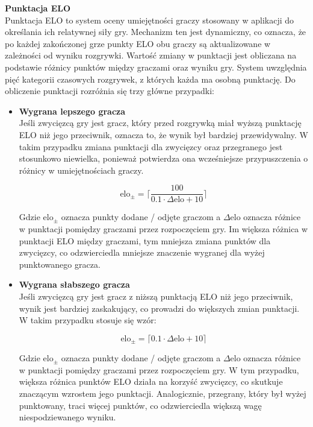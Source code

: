 \documentclass[twoside]{projektInzynierskiMS1}
\begin{document}
\newpage

\noindent \textbf{Punktacja ELO}\\
Punktacja ELO to system oceny umiejętności graczy stosowany w aplikacji do określania ich relatywnej siły gry. Mechanizm ten jest dynamiczny, co oznacza, że po każdej zakończonej grze punkty ELO obu graczy są aktualizowane w zależności od wyniku rozgrywki. Wartość zmiany w punktacji jest obliczana na podstawie różnicy punktów między graczami oraz wyniku gry. System uwzględnia pięć kategorii czasowych rozgrywek, z których każda ma osobną punktację. Do obliczenie punktacji rozróżnia się trzy główne przypadki:

\begin{itemize}
    \item \textbf{Wygrana lepszego gracza}\\
    Jeśli zwycięzcą gry jest gracz, który przed rozgrywką miał wyższą punktację ELO niż jego przeciwnik, oznacza to, że wynik był bardziej przewidywalny. W takim przypadku zmiana punktacji dla zwycięzcy oraz przegranego jest stosunkowo niewielka, ponieważ potwierdza ona wcześniejsze przypuszczenia o różnicy w umiejętnościach graczy.

    \[ \text{elo}_{\pm} = \lceil \frac{100}{0.1 \cdot \Delta \text{elo} + 10} \rceil \]

    Gdzie $ \text{elo}_{\pm} $ oznacza punkty dodane / odjęte graczom a $ \Delta \text{elo} $ oznacza różnice w punktacji pomiędzy graczami przez rozpoczęciem gry. Im większa różnica w punktacji ELO między graczami, tym mniejsza zmiana punktów dla zwycięzcy, co odzwierciedla mniejsze znaczenie wygranej dla wyżej punktowanego gracza.

    \item \textbf{Wygrana słabszego gracza}\\
    Jeśli zwycięzcą gry jest gracz z niższą punktacją ELO niż jego przeciwnik, wynik jest bardziej zaskakujący, co prowadzi do większych zmian punktacji. W takim przypadku stosuje się wzór:

    \[ \text{elo}_{\pm} = \lceil 0.1 \cdot \Delta \text{elo} + 10 \rceil \]

    Gdzie $ \text{elo}_{\pm} $ oznacza punkty dodane / odjęte graczom a $ \Delta \text{elo} $ oznacza różnice w punktacji pomiędzy graczami przez rozpoczęciem gry. W tym przypadku, większa różnica punktów ELO działa na korzyść zwycięzcy, co skutkuje znaczącym wzrostem jego punktacji. Analogicznie, przegrany, który był wyżej punktowany, traci więcej punktów, co odzwierciedla większą wagę niespodziewanego wyniku.


\end{itemize}
\end{document}
